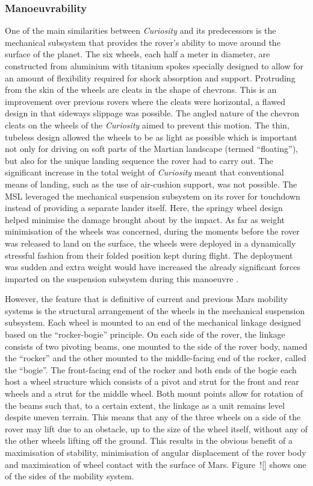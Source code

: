       \subsubsection{Manoeuvrability}
        One of the main similarities between \textit{Curiosity} and its predecessors is the mechanical subsystem that provides the rover's ability to move around the surface of the planet. The six wheels, each half a meter in diameter, are constructed from aluminium with titanium spokes specially designed to allow for an amount of flexibility required for shock absorption and support. Protruding from the skin of the wheels are cleats in the shape of chevrons. This is an improvement over previous rovers where the cleats were horizontal, a flawed design in that sideways slippage was possible. The angled nature of the chevron cleats on the wheels of the \textit{Curiosity} aimed to prevent this motion. The thin, tubeless design allowed the wheels to be as light as possible which is important not only for driving on soft parts of the Martian landscape (termed ``floating''), but also for the unique landing sequence the rover had to carry out. The significant increase in the total weight of \textit{Curiosity} meant that conventional means of landing, such as the use of air-cushion support, was not possible. The MSL leveraged the mechanical suspension subsystem on its rover for touchdown instead of providing a separate lander itself. Here, the springy wheel design helped minimise the damage brought about by the impact. As far as weight minimisation of the wheels was concerned, during the moments before the rover was released to land on the surface, the wheels were deployed in a dynamically stressful fashion from their folded position kept during flight. The deployment was sudden and extra weight would have increased the already significant forces imparted on the suspension subsystem during this manoeuvre \cite{planetary2014}.
        
        However, the feature that is definitive of current and previous Mars mobility systems is the structural arrangement of the wheels in the mechanical suspension subsystem. Each wheel is mounted to an end of the mechanical linkage designed based on the ``rocker-bogie'' principle. On each side of the rover, the linkage consists of two pivoting beams, one mounted to the side of the rover body, named the ``rocker'' and the other mounted to the middle-facing end of the rocker, called the ``bogie''. The front-facing end of the rocker and both ends of the bogie each host a wheel structure which consists of a pivot and strut for the front and rear wheels and a strut for the middle wheel. Both mount points allow for rotation of the beams such that, to a certain extent, the linkage as a unit remains level despite uneven terrain. This means that any of the three wheels on a side of the rover may lift due to an obstacle, up to the size of the wheel itself, without any of the other wheels lifting off the ground. This results in the obvious benefit of a maximisation of stability, minimisation of angular displacement of the rover body and maximisation of wheel contact with the surface of Mars. Figure~![] shows one of the sides of the mobility system.
        
